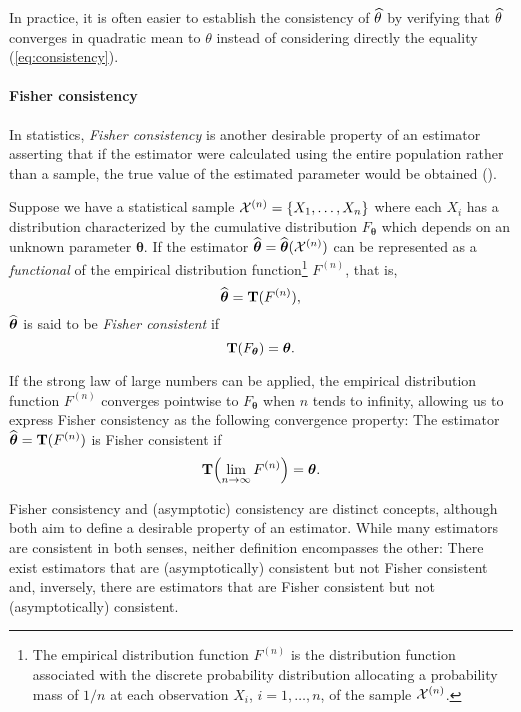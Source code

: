 In practice, it is often easier to establish the consistency of $\widehat{\theta}$ by verifying that $\widehat{\theta}$ converges in quadratic mean to $\theta$ instead of considering directly the equality (\ref{eq:consistency}).

\paragraph{Fisher consistency}

In statistics, \emph{Fisher consistency} is another desirable property of an estimator asserting that if the estimator were calculated using the entire population rather than a sample, the true value of the estimated parameter would be obtained (\citealp{fisher:1922}).

Suppose we have a statistical sample ${\cal X}^{(n)}=\{X_1,\ldots,X_n\}$ where each $X_i$ has a distribution characterized by the cumulative distribution $F_{\boldsymbol\theta}$ which depends on an unknown parameter $\boldsymbol\theta$. If the estimator $\widehat{\boldsymbol\theta}=\widehat{\boldsymbol\theta}({\cal X}^{(n)})$ can be represented as a \emph{functional} of the empirical distribution function\footnote{The empirical distribution function $F^{(n)}$ is the distribution function associated with the discrete probability distribution allocating a probability mass of $1/n$ at each observation $X_i$, $i=1,\ldots,n$, of the sample ${\cal X}^{(n)}$.} $F^{(n)}$, that is, 
\[
	\widehat{\boldsymbol\theta}=\mathbf T(F^{(n)}),
\] 
$\widehat{\boldsymbol\theta}$ is said to be \emph{Fisher consistent} if
\[
	\mathbf T(F_{\boldsymbol\theta})=\boldsymbol\theta .
\]

If the strong law of large numbers can be applied, the empirical distribution function $F^{(n)}$ converges pointwise to $F_{\boldsymbol\theta}$ when $n$ tends to infinity, allowing us to express Fisher consistency as the following convergence property: The estimator $\widehat{\boldsymbol\theta}=\mathbf T(F^{(n)})$ is Fisher consistent if
\[
	\stvec{T}\left(\lim_{n\rightarrow\infty} F^{(n)}\right)=\boldsymbol\theta .
\] 

Fisher consistency and (asymptotic) consistency are distinct concepts, although both aim to define a desirable property of an estimator. While many estimators are consistent in both senses, neither definition encompasses the other: There exist estimators that are (asymptotically) consistent but not Fisher consistent and, inversely, there are estimators that are Fisher consistent but not (asymptotically) consistent.

